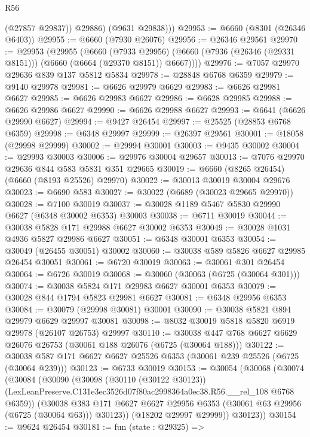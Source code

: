 \begin{lexlean}{R56}
\begin{coremodule}
            (@27857 @29837))
          @29886)
        (@9631 @29838)))
@29953 := @6660 (@8301 (@26346 @6403))
@29955 := @6660 (@7930 @26076)
@29956 := @26346 @29561
@29970 := @29953
    (@29955
      (@6660
        (@7933 @29956)
        (@6660 (@7936 (@26346 (@29331 @8151))) (@6660 (@6664 (@29370 @8151)) @6667))))
@29976 := @7057 @29970 @29636 @839 @137 @5812 @5834
@29978 := @28848 @6768 @6359
@29979 := @9140 @29978
@29981 := @6626 @29979 @6629
@29983 := @6626 @29981 @6627
@29985 := @6626 @29983 @6627
@29986 := @6628 @29985
@29988 := @6626 @29986 @6627
@29990 := @6626 @29988 @6627
@29993 := @6641 (@6626 @29990 @6627)
@29994 := @9427 @26454
@29997 := @25525 (@28853 @6768 @6359)
@29998 := @6348 @29997
@29999 := @26397 @29561
@30001 := @18058 (@29998 @29999)
@30002 := @29994 @30001
@30003 := @9435 @30002
@30004 := @29993 @30003
@30006 := @29976 @30004 @29657
@30013 := @7076 @29970 @29636 @844 @583 @5831 @351 @29665
@30019 := @6660 (@8265 @26454) (@6660 (@8193 @25526) @29970)
@30022 := @30013 @30019 @30004 @29676
@30023 := @6690 @583
@30027 := @30022 (@6689 (@30023 @29665 @29970))
@30028 := @7100 @30019
@30037 := @30028 @1189 @5467 @5830 @29990 @6627 (@6348 @30002 @6353) @30003
@30038 := @6711 @30019
@30044 := @30038 @5828 @171 @29988 @6627 @30002 @6353
@30049 := @30028 @1031 @4936 @5827 @29986 @6627
@30051 := @6348 @30001 @6353
@30054 := @30049 (@26455 @30051) @30002
@30060 := @30038 @589 @5826 @6627 @29985 @26454 @30051
@30061 := @6720 @30019
@30063 := @30061 @301 @26454
@30064 := @6726 @30019
@30068 := @30060 (@30063 (@6725 (@30064 @301)))
@30074 := @30038 @5824 @171 @29983 @6627 @30001 @6353
@30079 := @30028 @844 @1794 @5823 @29981 @6627
@30081 := @6348 @29956 @6353
@30084 := @30079 (@29998 @30081) @30001
@30090 := @30038 @5821 @894 @29979 @6629 @29997 @30081
@30098 := @8032 @30019 @5818 @5820 @6919 @29978 (@26107 @26753) @29997
@30110 := @30038 @447 @768 @6627 @6629 @26076 @26753 (@30061 @188 @26076 (@6725 (@30064 @188)))
@30122 := @30038 @587 @171 @6627 @6627 @25526 @6353 (@30061 @239 @25526 (@6725 (@30064 @239)))
@30123 := @6733 @30019
@30153 := @30054
    (@30068
      (@30074
        (@30084
          (@30090
            (@30098
              (@30110 (@30122 @30123))
              (LexLeanPreserve.C131e3ec3526d07f80ac2998364a0ec38.R56.__rel_108 @6768 @6359))
            (@30038
              @383
              @171
              @6627
              @6627
              @29956
              @6353
              (@30061 @63 @29956 (@6725 (@30064 @63)))
              @30123))
          (@18202 @29997 @29999))
        @30123))
@30154 := @9624 @26454
@30181 := fun (state : @29325) =>

\end{coremodule}
\end{lexlean}
